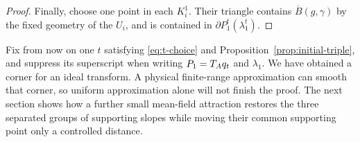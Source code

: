 \begin{proof}
Finally, choose one point in each \(K_i^1\).  Their triangle contains
\(\overline B(g,\gamma)\) by the fixed geometry of the \(U_i\), and
is contained in \(\partial P_1^t(\lambda_1^t)\).
\end{proof}

Fix from now on one \(t\) satisfying \eqref{eq:t-choice} and
Proposition~\ref{prop:initial-triple}, and suppress its superscript
when writing \(P_1=T_Aq_t\) and \(\lambda_1\).
We have obtained a corner for an ideal transform.  A physical
finite-range approximation can smooth that corner, so uniform
approximation alone will not finish the proof.  The next section
shows how a further small mean-field attraction restores the
three separated groups of supporting slopes while moving their
common supporting point only a controlled distance.
